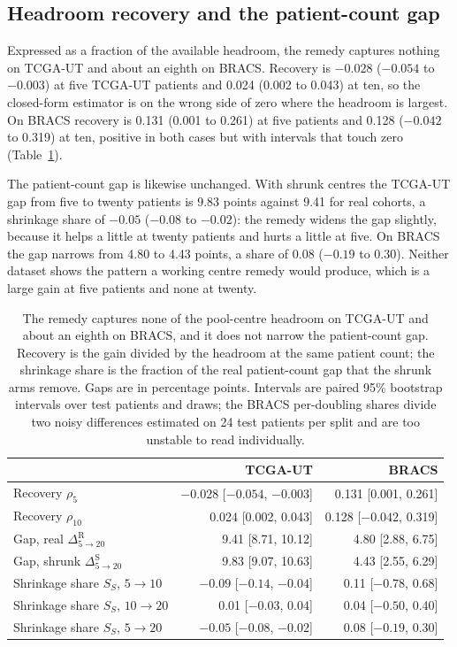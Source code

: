 \documentclass[11pt]{article}
\begin{document}
\subsection{Headroom recovery and the patient-count gap}
\label{sec:recovery-results}
Expressed as a fraction of the available headroom, the remedy captures nothing on TCGA-UT and about an eighth on BRACS. Recovery is $-0.028$ ($-0.054$ to $-0.003$) at five TCGA-UT patients and 0.024 (0.002 to 0.043) at ten, so the closed-form estimator is on the wrong side of zero where the headroom is largest. On BRACS recovery is 0.131 (0.001 to 0.261) at five patients and 0.128 ($-0.042$ to 0.319) at ten, positive in both cases but with intervals that touch zero (Table~\ref{tab:shares}).

The patient-count gap is likewise unchanged. With shrunk centres the TCGA-UT gap from five to twenty patients is 9.83 points against 9.41 for real cohorts, a shrinkage share of $-0.05$ ($-0.08$ to $-0.02$): the remedy widens the gap slightly, because it helps a little at twenty patients and hurts a little at five. On BRACS the gap narrows from 4.80 to 4.43 points, a share of 0.08 ($-0.19$ to 0.30). Neither dataset shows the pattern a working centre remedy would produce, which is a large gain at five patients and none at twenty.

\begin{table}[htbp]
\centering
\small
\renewcommand{\arraystretch}{1.15}
\begin{tabular}{@{}lrr@{}}
\toprule
 & TCGA-UT & BRACS \\
\midrule
Recovery $\rho_5$ & $-0.028$ [$-0.054$, $-0.003$] & 0.131 [0.001, 0.261] \\
Recovery $\rho_{10}$ & 0.024 [0.002, 0.043] & 0.128 [$-0.042$, 0.319] \\
\addlinespace
Gap, real $\Delta^{\mathrm R}_{5\to20}$ & 9.41 [8.71, 10.12] & 4.80 [2.88, 6.75] \\
Gap, shrunk $\Delta^{\mathrm S}_{5\to20}$ & 9.83 [9.07, 10.63] & 4.43 [2.55, 6.29] \\
Shrinkage share $S_S$, $5\to10$ & $-0.09$ [$-0.14$, $-0.04$] & 0.11 [$-0.78$, 0.68] \\
Shrinkage share $S_S$, $10\to20$ & 0.01 [$-0.03$, 0.04] & 0.04 [$-0.50$, 0.40] \\
Shrinkage share $S_S$, $5\to20$ & $-0.05$ [$-0.08$, $-0.02$] & 0.08 [$-0.19$, 0.30] \\
\bottomrule
\end{tabular}
\caption{The remedy captures none of the pool-centre headroom on TCGA-UT and about an eighth on BRACS, and it does not narrow the patient-count gap. Recovery is the gain divided by the headroom at the same patient count; the shrinkage share is the fraction of the real patient-count gap that the shrunk arms remove. Gaps are in percentage points. Intervals are paired 95\% bootstrap intervals over test patients and draws; the BRACS per-doubling shares divide two noisy differences estimated on 24 test patients per split and are too unstable to read individually.}
\label{tab:shares}
\end{table}
\end{document}
